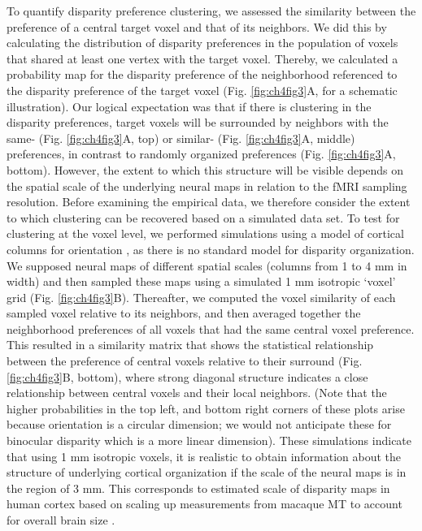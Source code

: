 To quantify disparity preference clustering, we assessed the similarity between the preference of a central target voxel and that of its neighbors. We did this by calculating the distribution of disparity preferences in the population of voxels that shared at least one vertex with the target voxel. Thereby, we calculated a probability map for the disparity preference of the neighborhood referenced to the disparity preference of the target voxel (Fig. \ref{fig:ch4fig3}A, for a schematic illustration). Our logical expectation was that if there is clustering in the disparity preferences, target voxels will be surrounded by neighbors with the same- (Fig. \ref{fig:ch4fig3}A, top) or similar- (Fig. \ref{fig:ch4fig3}A, middle) preferences, in contrast to randomly organized preferences (Fig. \ref{fig:ch4fig3}A, bottom). However, the extent to which this structure will be visible depends on the spatial scale of the underlying neural maps in relation to the fMRI sampling resolution. Before examining the empirical data, we therefore consider the extent to which clustering can be recovered based on a simulated data set.
To test for clustering at the voxel level, we performed simulations using a model of cortical columns for orientation \cite{ROJER:1990bq}, as there is no standard model for disparity organization. We supposed neural maps of different spatial scales (columns from 1 to 4 mm in width) and then sampled these maps using a simulated 1 mm isotropic `voxel' grid (Fig. \ref{fig:ch4fig3}B). Thereafter, we computed the voxel similarity of each sampled voxel relative to its neighbors, and then averaged together the neighborhood preferences of all voxels that had the same central voxel preference. This resulted in a similarity matrix that shows the statistical relationship between the preference of central voxels relative to their surround (Fig. \ref{fig:ch4fig3}B, bottom), where strong diagonal structure indicates a close relationship between central voxels and their local neighbors. (Note that the higher probabilities in the top left, and bottom right corners of these plots arise because orientation is a circular dimension; we would not anticipate these for binocular disparity which is a more linear dimension). These simulations indicate that using 1 mm isotropic voxels, it is realistic to obtain information about the structure of underlying cortical organization if the scale of the neural maps is in the region of 3 mm. This corresponds to estimated scale of disparity maps in human cortex based on scaling up measurements from macaque MT to account for overall brain size \cite{DeAngelis:1999fk,Ban:2012jr}.
